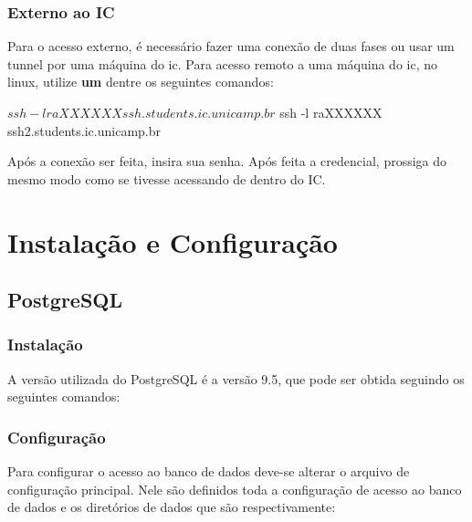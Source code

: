 \documentclass[a4paper,10pt]{article}
\begin{document}
        \subsubsection{Externo ao IC}
        Para o acesso externo, é necessário fazer uma conexão de duas fases ou usar um tunnel por uma máquina do ic. Para acesso remoto a uma máquina do ic, no linux, utilize \textbf{um} dentre os seguintes comandos:
        \begin{spverbatim}
        $ ssh -l raXXXXXX ssh.students.ic.unicamp.br
        $ ssh -l raXXXXXX ssh2.students.ic.unicamp.br
        \end{spverbatim}

        Após a conexão ser feita, insira sua senha. Após feita a credencial, prossiga do mesmo modo como se tivesse acessando de dentro do IC.

\section{Instalação e Configuração}
    \subsection{PostgreSQL}
        \subsubsection{Instalação}
        A versão utilizada do PostgreSQL é a versão 9.5, que pode ser obtida seguindo os seguintes comandos:

        \subsubsection{Configuração}
        Para configurar o acesso ao banco de dados deve-se alterar o arquivo de configuração principal. Nele são definidos toda a configuração de acesso ao banco de dados e os diretórios de dados que são respectivamente:
\end{document}

